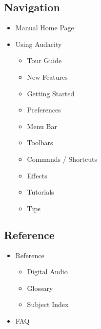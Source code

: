 										

				
			
		
		
															
							
							
		
\subsection{Navigation}

		
			\begin{itemize}\item  Manual Home Page
\item  Using Audacity
\begin{itemize}
\item  Tour Guide
\item  New Features
\item  Getting Started
\item  Preferences
\item  Menu Bar
\item  Toolbars
\item  Commands / Shortcuts
\item  Effects
\item  Tutorials
\item  Tips
\end{itemize}
\end{itemize}
		
		
		
		
\subsection{Reference}

		
			\begin{itemize}\item  Reference
\begin{itemize}
\item  Digital Audio
\item  Glossary
\item  Subject Index
\end{itemize}
\item  
FAQ

\end{itemize}
		
